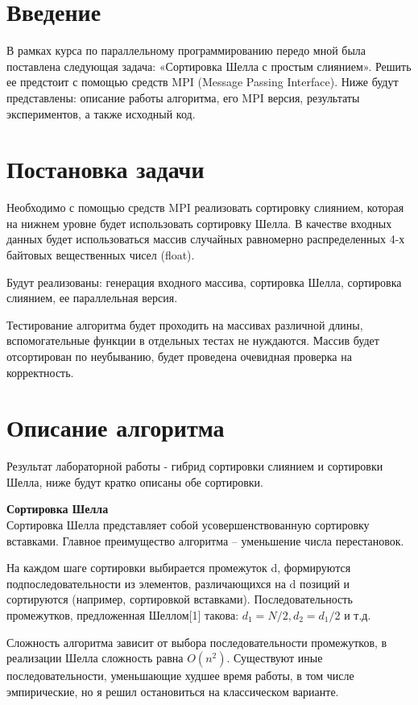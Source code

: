 \documentclass[14pt, a4paper]{extarticle}
\begin{document}
	\section{Введение}
        В рамках курса по параллельному программированию передо мной была поставлена следующая задача: «Сортировка Шелла с простым слиянием». Решить ее предстоит с помощью средств MPI (Message Passing Interface). Ниже будут представлены: описание работы алгоритма, его MPI версия, результаты экспериментов, а также исходный код.
	\newpage

	\section{Постановка задачи}
        Необходимо с помощью средств MPI реализовать сортировку слиянием, которая на нижнем уровне будет использовать сортировку Шелла. В качестве входных данных будет использоваться массив случайных равномерно распределенных 4-х байтовых вещественных чисел (float).

        Будут реализованы: генерация входного массива, сортировка Шелла, сортировка слиянием, ее параллельная версия. 

        Тестирование алгоритма будет проходить на массивах различной длины, вспомогательные функции в отдельных тестах не нуждаются. Массив будет отсортирован по неубыванию, будет проведена очевидная проверка на корректность. 

	\newpage

	\section{Описание алгоритма}
	Результат лабораторной работы - гибрид сортировки слиянием и сортировки Шелла, ниже будут кратко описаны обе сортировки.

	\textbf{Сортировка Шелла }\\
        Сортировка Шелла представляет собой усовершенствованную сортировку вставками. Главное преимущество алгоритма – уменьшение числа перестановок.
        
        На каждом шаге сортировки выбирается промежуток d, формируются подпоследовательности из элементов, различающихся на d позиций и сортируются (например, сортировкой вставками). Последовательность  промежутков, предложенная Шеллом[1] такова: $d_1=N/2, d_2=d_1/2$ и т.д.

        Сложность алгоритма зависит от выбора последовательности промежутков, в реализации Шелла сложность равна $O(n^2)$.
        Существуют иные последовательности, уменьшающие худшее время работы, в том числе эмпирические, но я решил остановиться на классическом варианте.
        
\end{document}
